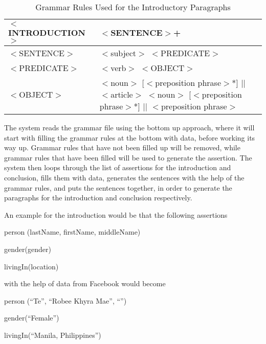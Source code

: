 \begin{table}[ph!]   %
	\centering
	\caption{Grammar Rules Used for the Introductory Paragraphs} \vspace{0.25em}
	\begin{tabular}{|p{2in}|p{2.5in}|} \hline
		$<$INTRODUCTION$>$ &$<$SENTENCE$>$+ \\ \hline
		$<$SENTENCE$>$ & $<$subject$>$ $<$PREDICATE$>$ \\ \hline
		$<$PREDICATE$>$ & $<$verb$>$ $<$OBJECT$>$ \\ \hline
		$<$OBJECT$>$ & $<$noun$>$ [$<$preposition phrase$>$*] $|$$|$ \newline
		$<$article$>$ $<$noun$>$ [$<$preposition phrase$>$*] $|$$|$\newline
		$<$preposition phrase$>$ \\ \hline
	\end{tabular}
	\label{tab:GrammarRules}
\end{table}
The system reads the grammar file using the bottom up approach, where it will start with filling the grammar rules at the bottom with data, before working its way up. Grammar rules that have not been filled up will be removed, while grammar rules that have been filled will be used to generate the assertion. The system then loops through the list of assertions for the introduction and conclusion, fills them with data, generates the sentences with the help of the grammar rules, and puts the sentences together, in order to generate the paragraphs for the introduction and conclusion respectively. 

An example for the introduction would be that the following assertions

\begin{center} person (lastName, firstName, middleName) \end{center}
\begin{center} gender(gender) \end{center}
\begin{center} livingIn(location) \end{center}

with the help of data from Facebook would become

\begin{center} person (``Te'', ``Robee Khyra Mae'', ``'') \end{center}
\begin{center} gender(``Female'') \end{center}
\begin{center} livingIn(``Manila, Philippines'') \end{center}


